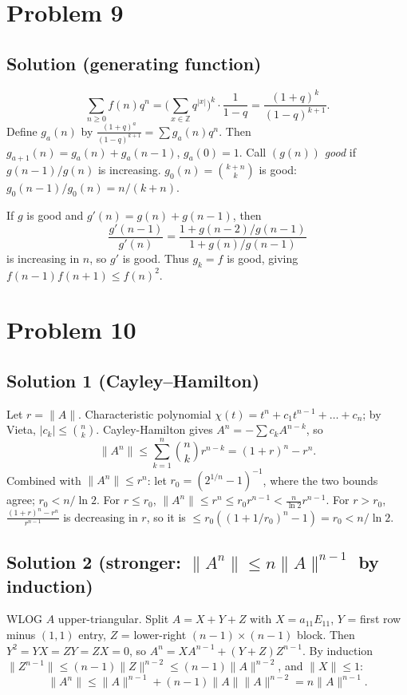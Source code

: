 \documentclass{article}
\begin{document}
\section*{Problem 9}
\subsection*{Solution (generating function)}
\[ \sum_{n \ge 0} f(n) q^n = \Big(\sum_{x \in \mathbb{Z}} q^{|x|}\Big)^k \cdot \frac{1}{1-q} = \frac{(1+q)^k}{(1-q)^{k+1}}. \]
Define $g_a(n)$ by $\frac{(1+q)^a}{(1-q)^{k+1}} = \sum g_a(n) q^n$. Then $g_{a+1}(n) = g_a(n) + g_a(n-1)$, $g_a(0) = 1$. Call $(g(n))$ \emph{good} if $g(n-1)/g(n)$ is increasing. $g_0(n) = \binom{k+n}{k}$ is good: $g_0(n-1)/g_0(n) = n/(k+n)$.

If $g$ is good and $g'(n) = g(n) + g(n-1)$, then
\[ \frac{g'(n-1)}{g'(n)} = \frac{1 + g(n-2)/g(n-1)}{1 + g(n)/g(n-1)} \]
is increasing in $n$, so $g'$ is good. Thus $g_k = f$ is good, giving $f(n-1) f(n+1) \le f(n)^2$.

\section*{Problem 10}
\subsection*{Solution 1 (Cayley--Hamilton)}
Let $r = \|A\|$. Characteristic polynomial $\chi(t) = t^n + c_1 t^{n-1} + \dots + c_n$; by Vieta, $|c_k| \le \binom{n}{k}$. Cayley-Hamilton gives $A^n = -\sum c_k A^{n-k}$, so
\[ \|A^n\| \le \sum_{k=1}^n \binom{n}{k} r^{n-k} = (1+r)^n - r^n. \]
Combined with $\|A^n\| \le r^n$: let $r_0 = (2^{1/n} - 1)^{-1}$, where the two bounds agree; $r_0 < n/\ln 2$. For $r \le r_0$, $\|A^n\| \le r^n \le r_0 r^{n-1} < \frac{n}{\ln 2} r^{n-1}$. For $r > r_0$, $\frac{(1+r)^n - r^n}{r^{n-1}}$ is decreasing in $r$, so it is $\le r_0((1+1/r_0)^n - 1) = r_0 < n/\ln 2$.

\subsection*{Solution 2 (stronger: $\|A^n\| \le n \|A\|^{n-1}$ by induction)}
WLOG $A$ upper-triangular. Split $A = X + Y + Z$ with $X = a_{11} E_{11}$, $Y$ = first row minus $(1,1)$ entry, $Z$ = lower-right $(n-1) \times (n-1)$ block. Then $Y^2 = YX = ZY = ZX = 0$, so $A^n = X A^{n-1} + (Y+Z) Z^{n-1}$. By induction $\|Z^{n-1}\| \le (n-1)\|Z\|^{n-2} \le (n-1)\|A\|^{n-2}$, and $\|X\| \le 1$:
\[ \|A^n\| \le \|A\|^{n-1} + (n-1)\|A\|\|A\|^{n-2} = n \|A\|^{n-1}. \]
\end{document}
